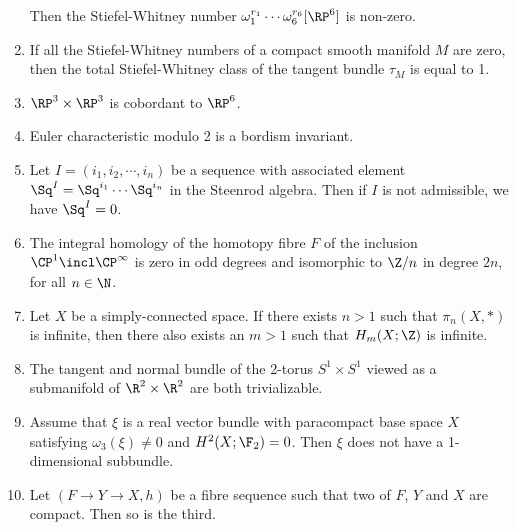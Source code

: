 \begin{questions*}
\begin{enumerate}
			Then the Stiefel-Whitney number $\omega_1^{r_1} \cdots \omega_6^{r_6}[\RP^6]$ is non-zero.
		\item If all the Stiefel-Whitney numbers of a compact smooth manifold $M$ are zero, then the total Stiefel-Whitney class of the tangent bundle $\tau_M$ is equal to 1.
		\item $\RP^3 \times \RP^3$ is cobordant to $\RP^6$.
		\item Euler characteristic modulo 2 is a bordism invariant.
		\item Let $I = (i_1, i_2, \cdots, i_n)$ be a sequence with associated element $\Sq^I = \Sq^{i_1} \cdots \Sq^{i_n}$ in the Steenrod algebra.
			Then if $I$ is not admissible, we have $\Sq^I = 0$.
		\item The integral homology of the homotopy fibre $F$ of the inclusion $\CP^1 \incl \CP^\infty$ is zero in odd degrees and isomorphic to $\Zn{n}$ in degree $2n$, for all $n \in \N$.
		\item Let $X$ be a simply-connected space.
			If there exists $n > 1$ such that $\pi_n(X, *)$ is infinite, then there also exists an $m > 1$ such that $H_m(X; \Z)$ is infinite.
		\item The tangent and normal bundle of the 2-torus $S^1 \times S^1$ viewed as a submanifold of $\R^2 \times \R^2$ are both trivializable.
		\item Assume that $\xi$ is a real vector bundle with paracompact base space $X$ satisfying $\omega_3(\xi) \neq 0$ and $H^2(X; \F_2) = 0$.
			Then $\xi$ does not have a 1-dimensional subbundle.
		\item Let $(F \to Y \to X, h)$ be a fibre sequence such that two of $F$, $Y$ and $X$ are compact.
			Then so is the third.
	\end{enumerate}
\end{questions*}
